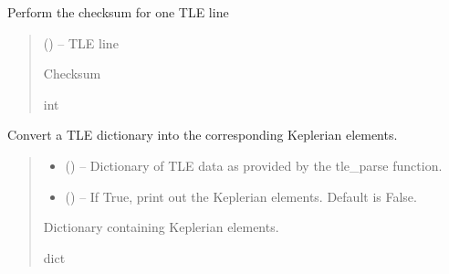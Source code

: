 \documentclass[letterpaper,10pt,english]{sphinxmanual}
\begin{document}
\begin{fulllineitems}
\label{\detokenize{fspsim.utils:fspsim.utils.Conversions.tle_checksum}}
\pysigstartsignatures
{}
\pysigstopsignatures
\sphinxAtStartPar
Perform the checksum for one TLE line
\begin{quote}\begin{description}
\sphinxAtStartPar
{} () – TLE line

\sphinxAtStartPar
Checksum

\sphinxAtStartPar
int

\end{description}\end{quote}

\end{fulllineitems}


\begin{fulllineitems}
\label{\detokenize{fspsim.utils:fspsim.utils.Conversions.tle_convert}}
\pysigstartsignatures
{}
\pysigstopsignatures
\sphinxAtStartPar
Convert a TLE dictionary into the corresponding Keplerian elements.
\begin{quote}\begin{description}
\begin{itemize}
\item {} 
\sphinxAtStartPar
{} () – Dictionary of TLE data as provided by the tle\_parse function.

\item {} 
\sphinxAtStartPar
{} () – If True, print out the Keplerian elements. Default is False.

\end{itemize}

\sphinxAtStartPar
Dictionary containing Keplerian elements.

\sphinxAtStartPar
dict

\end{description}\end{quote}

\end{fulllineitems}
\end{document}
